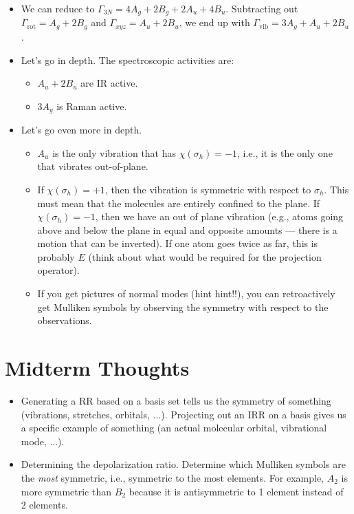 \documentclass[../notes.tex]{subfiles}
\begin{document}
\begin{itemize}
\begin{itemize}
        \item We can reduce to $\Gamma_{3N}=4A_g+2B_g+2A_u+4B_u$. Subtracting out $\Gamma_\text{rot}=A_g+2B_g$ and $\Gamma_{xyz}=A_u+2B_u$, we end up with $\Gamma_\text{vib}=3A_g+A_u+2B_u$.
        \item Let's go in depth. The spectroscopic activities are:
        \begin{itemize}
            \item $A_u+2B_u$ are IR active.
            \item $3A_g$ is Raman active.
        \end{itemize}
        \item Let's go even more in depth.
        \begin{itemize}
            \item $A_u$ is the only vibration that has $\chi(\sigma_h)=-1$, i.e., it is the only one that vibrates out-of-plane.
            \item If $\chi(\sigma_h)=+1$, then the vibration is symmetric with respect to $\sigma_h$. This must mean that the molecules are entirely confined to the plane. If $\chi(\sigma_h)=-1$, then we have an out of plane vibration (e.g.,  atoms going above and below the plane in equal and opposite amounts --- there is a motion that can be inverted). If one  atom goes twice as far, this is probably $E$ (think about what would be required for the projection operator).
            \item If you get pictures of normal modes (hint hint!!), you can retroactively get Mulliken symbols by observing the symmetry with respect to the observations.
        \end{itemize}
    \end{itemize}
\end{itemize}



\section{Midterm Thoughts}
\begin{itemize}
    \item Generating a RR based on a basis set tells us the symmetry of something (vibrations, stretches, orbitals, ...). Projecting out an IRR on a basis gives us a specific example of something (an actual molecular orbital, vibrational mode, ...).
    \item Determining the depolarization ratio. Determine which Mulliken symbols are the \emph{most} symmetric, i.e., symmetric to the most elements. For example, $A_2$ is more symmetric than $B_2$ because it is antisymmetric to 1 element instead of 2 elements.
\end{itemize}
\end{document}
